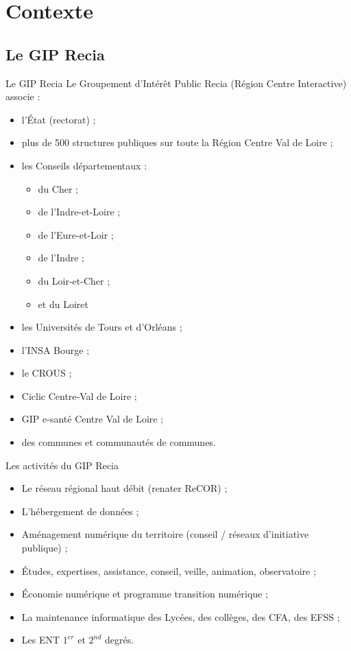 \section{Contexte}
\subsection{Le GIP Recia}
 \begin{frame}{Le GIP Recia}
	Le Groupement d’Intérêt Public Recia (Région Centre Interactive) associe : 
\begin{itemize}
\item l’État (rectorat) ;
\item plus de 500 structures publiques sur toute la Région Centre Val de Loire ;
\item les Conseils départementaux :
	\begin{itemize}
		\item du Cher ;
		\item de l’Indre-et-Loire ;
		\item de l’Eure-et-Loir ;
		\item de l'Indre ;
		\item du Loir-et-Cher ;
		\item et du Loiret
	\end{itemize}
\item les Universités de Tours et d’Orléans ;
\item l’INSA Bourge ;
\item le CROUS ;
\item Ciclic Centre-Val de Loire ; 
\item GIP e-santé Centre Val de Loire ; 
\item des communes et communautés de communes.
\end{itemize}
	
 \end{frame}
\begin{frame}{Les activités du GIP Recia }
\begin{itemize}
\item Le réseau régional haut débit (renater ReCOR) ;
\item L’hébergement de données ;
\item Aménagement numérique du territoire (conseil / réseaux d’initiative publique) ;
\item Études, expertises, assistance, conseil, veille, animation, observatoire ;
\item Économie numérique et programme transition numérique ;
\item La maintenance informatique des Lycées, des collèges, des CFA, des EFSS ;
\item Les ENT $1^{er}$ et $2^{nd}$ degrés.
\end{itemize}
\end{frame}

